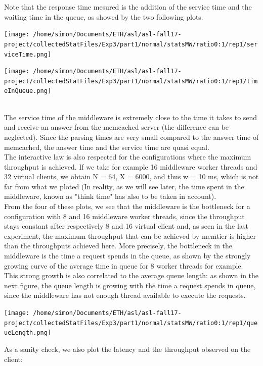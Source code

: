 \documentclass[11pt,a4paper]{article}
\begin{document}
Note that the response time mesured is the addition of the service time and the waiting time in the queue, as showed by the two following plots. 
\\
\begin{minipage}{0.5\linewidth}
\texttt{[image: /home/simon/Documents/ETH/asl/asl-fall17-project/collectedStatFiles/Exp3/part1/normal/statsMW/ratio0:1/rep1/serviceTime.png]}
\end{minipage}
\hfill
\begin{minipage}{0.5\linewidth}
\texttt{[image: /home/simon/Documents/ETH/asl/asl-fall17-project/collectedStatFiles/Exp3/part1/normal/statsMW/ratio0:1/rep1/timeInQueue.png]}
\end{minipage}
\\
The service time of the middleware is extremely close to the time it takes to send and receive an answer from the memcached server (the difference can be neglected). Since the parsing times are very small compared to the answer time of memcached, the answer time and the service time are quasi equal. 
\\
The interactive law is also respected for the configurations where the maximum throughput is achieved. If we take for example 16 middleware worker threads and 32 virtual clients, we obtain N = 64, X = 6000, and thus w = 10 ms, which is not far from what we ploted (In reality, as we will see later, the time spent in the middleware, known as "think time" has also to be taken in account). 
\\
From the four of these plots, we see that the middleware is the bottleneck for a configuration with 8 and 16 middleware worker threads, since the throughput stays constant after respectively 8 and 16 virtual client and, as seen in the last experiment, the maximum throughput that can be achieved by memtier is higher than the throughputs achieved here. More precisely, the bottleneck in the middleware is the time a request spends in the queue, as shown by the strongly growing curve of the average time in queue for 8 worker threads for example. This strong growth is also correlated to the average queue length: as shown in the next figure, the queue length is growing with the time a request spends in queue, since the middleware has not enough thread available to execute the requests. 
\begin{center}
\texttt{[image: /home/simon/Documents/ETH/asl/asl-fall17-project/collectedStatFiles/Exp3/part1/normal/statsMW/ratio0:1/rep1/queueLength.png]}
\end{center}
As a sanity check, we also plot the latency and the throughput observed on the client:
\end{document}
